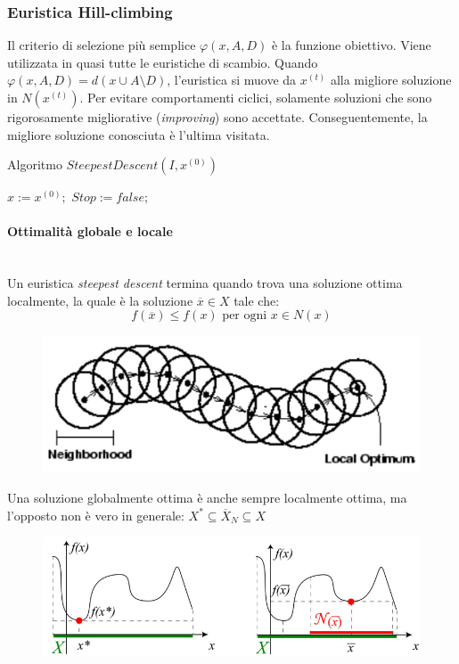 \documentclass{article}
\begin{document}
\subsubsection{Euristica Hill-climbing}
Il criterio di selezione più semplice $\varphi(x,A,D)$ è la funzione obiettivo. Viene utilizzata in quasi
tutte le euristiche di scambio. Quando $\varphi(x,A,D)=d(x\cup A\setminus D)$, l'euristica si muove da
$x^{(t)}$ alla migliore soluzione in $N(x^{(t)})$.
Per evitare comportamenti ciclici, solamente soluzioni che sono rigorosamente migliorative (\textit{improving})
sono accettate. Conseguentemente, la migliore soluzione conosciuta è l'ultima visitata.

\begin{algorithm}[H]
    \caption{Algoritmo $SteepestDescent(I,x^{(0)})$}
    \label{alg:steepest_des}
    \begin{algorithmic}
        \State $x:=x^{(0)};$
        \State $Stop := false;$
        \Else
        \EndIf
        \EndWhile
    \end{algorithmic}
\end{algorithm}
\paragraph{Ottimalità globale e locale}\mbox{}\\
Un euristica \textit{steepest descent} termina quando trova una soluzione ottima localmente, la quale è la soluzione
$\overline{x}\in X$ tale che:
$$f(\overline{x})\leq f(x)\text{ per ogni }x\in N(x)$$
\begin{figure}[H]
    \centering
    \includegraphics[scale=0.5]{images/local_opt.png}
\end{figure}
Una soluzione globalmente ottima è anche sempre localmente ottima, ma l'opposto non è vero in generale:
$X^*\subseteq\overline{X}_N\subseteq X$
\begin{figure}[H]
    \centering
    \includegraphics[scale=0.5]{images/opt_neigh.png}
\end{figure}
\end{document}
